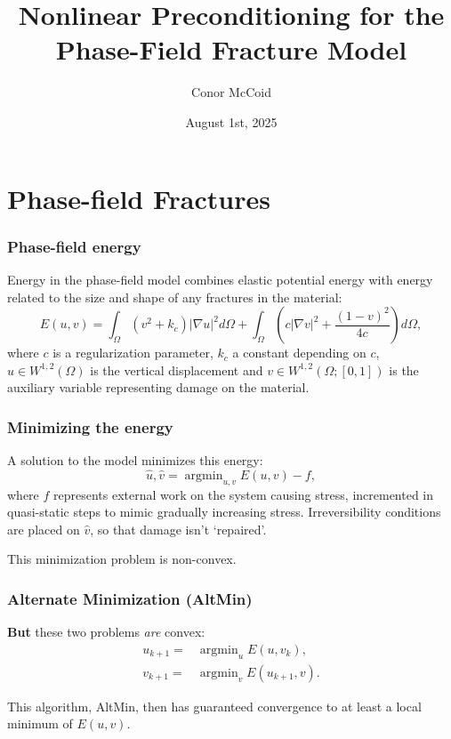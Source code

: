 \documentclass{beamer}
\title{Nonlinear Preconditioning for the Phase-Field Fracture Model}
\author{Conor McCoid}
\institute{McMaster University}
\date{August 1st, 2025}
\DeclareMathOperator{\argmin}{argmin}
\begin{document}
\maketitle

\section{Phase-field Fractures}

\begin{frame}
\frametitle{Phase-field energy}

Energy in the phase-field model combines elastic potential energy with energy related to the size and shape of any fractures in the material:
\begin{equation*}
E(u,v) = \int_\Omega \left ( v^2 + k_c \right ) \lvert \nabla u \rvert^2 d\Omega
		+ \int_\Omega \left ( c \lvert \nabla v \rvert^2 + \frac{(1 - v)^2}{4c} \right ) d\Omega,
\end{equation*}
where $c$ is a regularization parameter, $k_c$ a constant depending on $c$, $u \in W^{1,2}(\Omega)$ is the vertical displacement and $v \in W^{1,2}(\Omega; [0,1])$ is the auxiliary variable representing damage on the material.

\end{frame}

\begin{frame}
\frametitle{Minimizing the energy}

A solution to the model minimizes this energy:
\begin{equation*}
\hat{u}, \hat{v} = \argmin_{u,v} E(u,v) - f,
\end{equation*}
where $f$ represents external work on the system causing stress, incremented in quasi-static steps to mimic gradually increasing stress.
Irreversibility conditions are placed on $\hat{v}$, so that damage isn't `repaired'.

This minimization problem is non-convex.

\end{frame}

\begin{frame}
\frametitle{Alternate Minimization (AltMin)}

\textbf{But} these two problems \textit{are} convex:
\begin{align*}
	u_{k+1} = & \argmin_u E(u, v_k), \\ v_{k+1} = & \argmin_v E(u_{k+1}, v).
\end{align*}

This algorithm, AltMin, then has guaranteed convergence to at least a local minimum of $E(u,v)$.

\end{frame}
\end{document}
